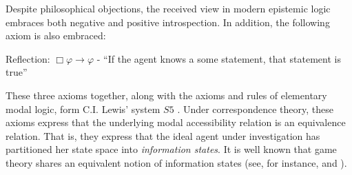 \documentclass[11pt]{article}
\numberwithin{equation}{subsection}
\renewcommand{\phi}{\varphi}
\begin{document}
Despite philosophical objections, the received view in modern
epistemic logic embraces both negative and positive introspection.  In
addition, the following axiom is also embraced:
\begin{bul}
	\item Reflection: $\Box \phi \to \phi$ - ``If the agent knows a some statement, that statement is true''
\end{bul}
These three axioms together, along with the axioms and rules of
elementary modal logic, form C.I. Lewis' system $S5$
\citep{lewis_symbolic_1951}.  Under correspondence theory, these
axioms express that the underlying modal accessibility relation is an
equivalence relation. That is, they express that the ideal agent under
investigation has partitioned her state space into \emph{information
  states}.  It is well known that game theory shares an equivalent
notion of information states (see, for instance,
\citet{halpern_set-theoretic_1999} and \citet[chapter
3]{rubinstein_modeling_1998}).
\end{document}

